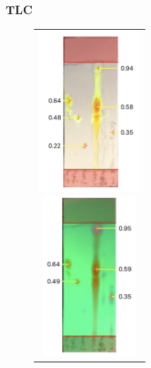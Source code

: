 \documentclass[a4paper,papersize,dvipdfmx]{jsarticle}
\begin{document}
\subsubsection*{TLC}
\begin{figure}[H]
\begin{center}
\begin{tabular}{c}
\begin{minipage}{0.22\hsize}
\begin{center}
\includegraphics[clip, height=6cm]{imgs/4-tlc1.jpg}

\end{center}
\end{minipage}
\begin{minipage}{0.05\hsize}
\hspace{2mm}
\end{minipage}
\begin{minipage}{0.22\hsize}
\begin{center}
\includegraphics[clip, height=6cm]{imgs/4-tlc2.jpg}

\end{center}
\end{minipage}
\end{tabular}
\end{center}
\end{figure}
\end{document}

